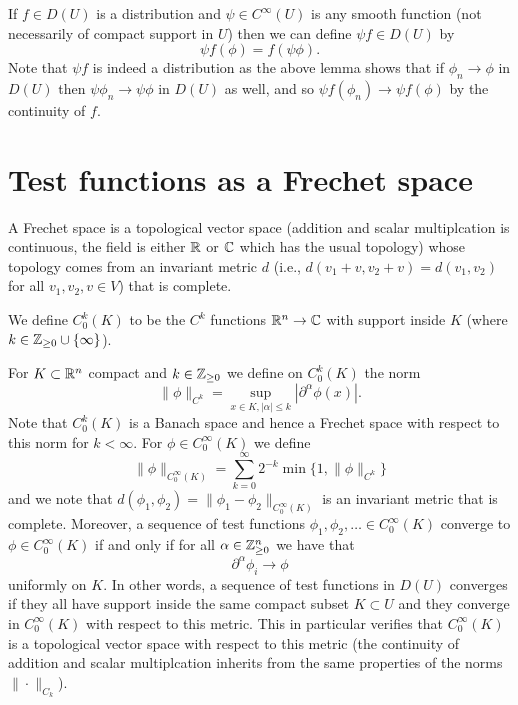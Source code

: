 \documentclass[twoside, a4paper, 10pt]{amsart}
\begin{document}
\begin{mydef} If $f \in D(U)$ is a distribution and $\psi \in C^{\infty}(U)$ is any smooth function (not necessarily of compact support in $U$) then we can define $\psi f \in D(U)$ by $$\psi f (\phi) = f(\psi \phi).$$ Note that $\psi f$ is indeed a distribution as the above lemma shows that if $\phi_n \to \phi$ in $D(U)$ then $\psi \phi_n \to \psi \phi$ in $D(U)$ as well, and so $\psi f (\phi_n) \to \psi f(\phi)$ by the continuity of $f$.

\end{mydef}
\section{Test functions as a Frechet space}

\begin{mydef} A Frechet space is a topological vector space (addition and scalar multiplcation is continuous, the field is either $\mathbb{R}$ or $\mathbb{C}$ which has the usual topology) whose topology comes from an invariant metric $d$ (i.e., $d(v_1+v, v_2+v) = d(v_1, v_2)$ for all $v_1,v_2,v \in V$) that is complete.

\end{mydef}

 We define $C_0^{k}(K)$ to be the $C^k$ functions $\mathbb{R}^n \to \mathbb{C}$ with support inside $K$ (where $k \in \mathbb{Z}_{\geq 0} \cup \{\infty\}$).

For $K \subset \mathbb{R}^n$ compact and $k \in \mathbb{Z}_{\geq 0}$ we define on $C_0^{k}(K)$ the norm $$\| \phi \|_{C^k} = \sup_{x \in K, |\alpha| \leq k} |\partial^{\alpha} \phi (x)|.$$ Note that $C_0^k(K)$ is a Banach space and hence a Frechet space with respect to this norm for $k < \infty$. For $\phi \in C_0^{\infty}(K)$ we define $$\|\phi\|_{C_0^{\infty}(K)} = \sum_{k=0}^{\infty} 2^{-k} \min\{1, \| \phi \|_{C^k} \} $$ and we note that $d(\phi_1, \phi_2) = \| \phi_1 - \phi_2 \|_{C_0^{\infty}(K)}$ is an invariant metric that is complete. Moreover, a sequence of test functions $\phi_1, \phi_2, \ldots \in C_0^{\infty}(K)$ converge to $\phi \in C_0^{\infty}(K)$ if and only if for all $\alpha \in \mathbb{Z}_{\geq 0}^n$ we have that $$\partial^{\alpha} \phi_i \to \phi$$ uniformly on $K$. In other words, a sequence of test functions in $D(U)$ converges if they all have support inside the same compact subset $K \subset U$ and they converge in $C_0^{\infty}(K)$ with respect to this metric. This in particular verifies that $C_0^{\infty}(K)$ is a topological vector space with respect to this metric (the continuity of addition and scalar multiplcation inherits from the same properties of the norms $\|\cdot \|_{C_k}$).
\end{document}
